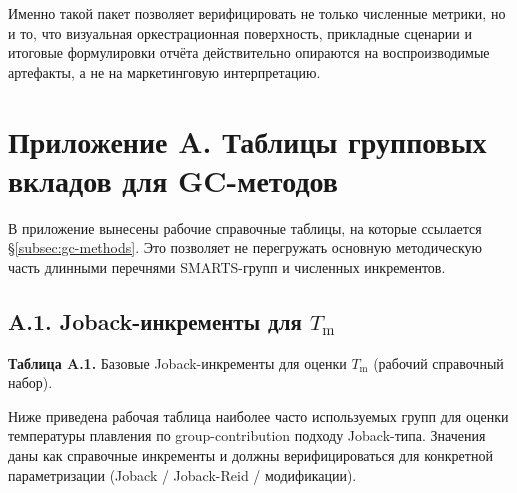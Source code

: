 \documentclass[11pt]{article}
\begin{document}
Именно такой пакет позволяет верифицировать не только численные метрики, но и то, что визуальная оркестрационная поверхность, прикладные сценарии и итоговые формулировки отчёта действительно опираются на воспроизводимые артефакты, а не на маркетинговую интерпретацию.

\appendix
\section*{Приложение A. Таблицы групповых вкладов для GC-методов}
\label{app:gc-tables}

В приложение вынесены рабочие справочные таблицы, на которые ссылается §\ref{subsec:gc-methods}. Это позволяет не перегружать основную методическую часть длинными перечнями SMARTS-групп и численных инкрементов.

\subsection*{A.1. Joback-инкременты для $T_{\mathrm{m}}$}
\label{appsubsec:joback-tm}

\textbf{Таблица A.1.} Базовые Joback-инкременты для оценки $T_{\mathrm{m}}$ (рабочий справочный набор).

Ниже приведена рабочая таблица наиболее часто используемых групп для оценки температуры плавления по group-contribution подходу Joback-типа. Значения даны как справочные инкременты и должны верифицироваться для конкретной параметризации (Joback / Joback-Reid / модификации).
\end{document}
